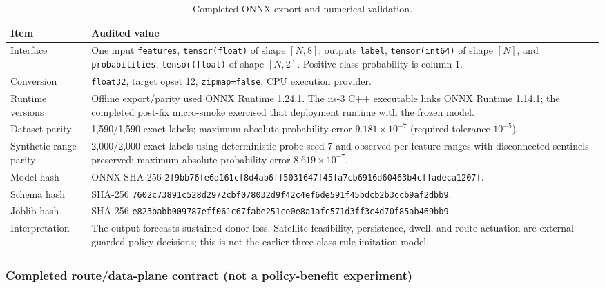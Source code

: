 \begin{table}[t]
\centering
\footnotesize
\caption{Completed ONNX export and numerical validation.}
\label{tab:audited_onnx_export}
\begin{tabular}{p{} p{}}
\hline
Item & Audited value \\
\hline
Interface & One input \texttt{features}, \texttt{tensor(float)} of shape $[N,8]$; outputs \texttt{label}, \texttt{tensor(int64)} of shape $[N]$, and \texttt{probabilities}, \texttt{tensor(float)} of shape $[N,2]$.  Positive-class probability is column 1. \\
Conversion & \texttt{float32}, target opset 12, \texttt{zipmap=false}, CPU execution provider. \\
Runtime versions & Offline export/parity used ONNX Runtime 1.24.1.  The ns-3 C++ executable links ONNX Runtime 1.14.1; the completed post-fix micro-smoke exercised that deployment runtime with the frozen model. \\
Dataset parity & 1,590/1,590 exact labels; maximum absolute probability error $9.181\times10^{-7}$ (required tolerance $10^{-5}$). \\
Synthetic-range parity & 2,000/2,000 exact labels using deterministic probe seed 7 and observed per-feature ranges with disconnected sentinels preserved; maximum absolute probability error $8.619\times10^{-7}$. \\
Model hash & ONNX SHA-256 \texttt{2f9bb76fe6d161cf\allowbreak 8d4ab6ff5031647f\allowbreak 45fa7cb6916d6046\allowbreak 3b4cffadeca1207f}. \\
Schema hash & SHA-256 \texttt{7602c73891c528d2\allowbreak 972cbf078032d9f4\allowbreak 2c4ef6de591f45bd\allowbreak cb2b3ccb9af2dbb9}. \\
Joblib hash & SHA-256 \texttt{e823babb009787ef\allowbreak f061c67fabe251ce\allowbreak 0e8a1afc571d3ff3\allowbreak c4d70f85ab469bb9}. \\
Interpretation & The output forecasts sustained donor loss.  Satellite feasibility, persistence, dwell, and route actuation are external guarded policy decisions; this is not the earlier three-class rule-imitation model. \\
\hline
\end{tabular}
\end{table}

\subsubsection*{Completed route/data-plane contract (not a policy-benefit experiment)}

